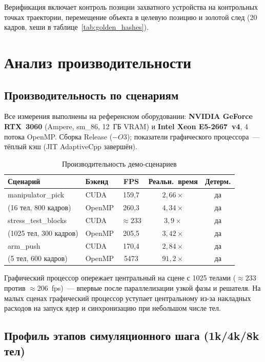 Верификация включает контроль позиции захватного устройства на контрольных точках траектории, перемещение 
объекта в целевую позицию и золотой след (20 кадров, хеши в таблице~\ref{tab:golden_hashes}).

\section{Анализ производительности}

\subsection{Производительность по сценариям}

Все измерения выполнены на референсном оборудовании:
\textbf{NVIDIA GeForce RTX~3060} (Ampere, sm\_86, 12~ГБ VRAM) и
\textbf{Intel Xeon E5-2667~v4}, 4 потока OpenMP.
Сборка Release ($-O3$); показатели графического процессора~--- тёплый кэш (JIT AdaptiveCpp
завершён).

\begin{table}[h]
\centering
\caption{Производительность демо-сценариев}
\label{tab:perf_demos}
\begin{tabular}{llccc}
\toprule
\textbf{Сценарий} & \textbf{Бэкенд} & \textbf{FPS} & \textbf{Реальн.\ время} & \textbf{Детерм.} \\
\midrule
manipulator\_pick & CUDA    & 159{,}7 & $2{,}66\times$ & да \\
(16 тел, 800 кадров) & OpenMP & 260{,}3 & $4{,}34\times$ & да \\
\midrule
stress\_test\_blocks & CUDA  & ${\approx}233$ & $3{,}9\times$  & да \\
(1025 тел, 300 кадров) & OpenMP & 205{,}5 & $3{,}42\times$ & да \\
\midrule
arm\_push         & CUDA    & 170{,}4 & $2{,}84\times$ & да \\
(5 тел, 600 кадров) & OpenMP & 5473 & $91{,}2\times$ & да \\
\bottomrule
\end{tabular}
\end{table}

Графический процессор опережает центральный на сцене с 1025 телами (${\approx}233$ против ${\approx}206$~fps)~--- впервые после
параллелизации узкой фазы и решателя. На малых сценах графический процессор уступает центральному из-за накладных расходов на запуск ядер 
и синхронизацию при небольшом числе тел.

\subsection{Профиль этапов симуляционного шага (1k/4k/8k тел)}

